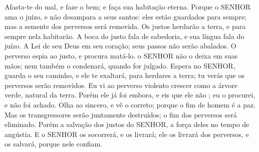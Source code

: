 {Afasta-te do mal, e faze o bem; e faça sua habitação eterna.
Porque o SENHOR ama o juízo, e não desampara a seus santos: eles estão guardados para sempre; mas a semente dos perversos será removida.
Os justos herdarão a terra, e para sempre nela habitarão.
A boca do justo fala de sabedoria, e sua língua fala do
{} juízo.
A Lei de seu Deus
{} em seu coração; seus passos não serão abalados.
O perverso espia ao justo, e procura matá-lo.
 o SENHOR não o deixa em suas mãos; nem também o condenará, quando for julgado.
Espera no SENHOR, guarda o seu caminho, e ele te exaltará, para herdares a terra; tu verás que os perversos serão removidos.
Eu vi ao perverso violento crescer como a árvore verde, natural da terra.
Porém ele já foi embora, e eis que ele não
{} ; eu o procurei, e não foi achado.
Olha ao sincero, e vê o correto; porque o fim de
{} homem é a paz.
Mas os transgressores serão juntamente destruídos; o fim dos perversos será eliminado.
Porém a salvação dos justos
{} do SENHOR,
{} a força deles no tempo de angústia.
E o SENHOR os socorrerá, e os livrará; ele os livrará dos perversos, e os salvará, porque nele confiam.

}

